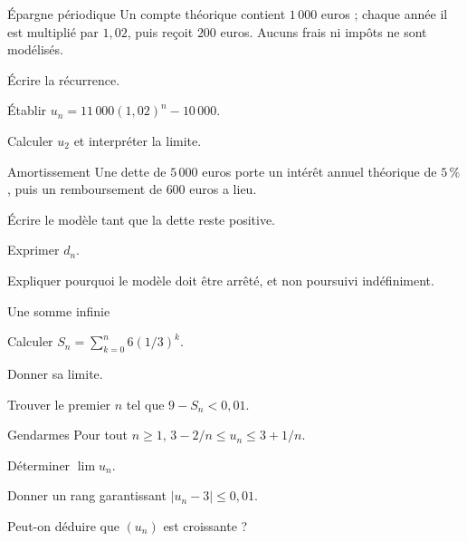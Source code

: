 \begingroup\renewcommand{\otBesoinPlace}[1]{}\begin{minipage}{\linewidth}
\begin{exercice}[2]{Épargne périodique}
Un compte théorique contient $1\,000$ euros ; chaque année il est multiplié par $1{,}02$, puis reçoit $200$ euros. Aucuns frais ni impôts ne sont modélisés.
\begin{questions}
\item Écrire la récurrence.
\item Établir $u_n=11\,000(1{,}02)^n-10\,000$.
\item Calculer $u_2$ et interpréter la limite.
\end{questions}
\end{exercice}
\begin{exercice}[2]{Amortissement}
Une dette de $5\,000$ euros porte un intérêt annuel théorique de $5\,\%$, puis un remboursement de $600$ euros a lieu.
\begin{questions}
\item Écrire le modèle tant que la dette reste positive.
\item Exprimer $d_n$.
\item Expliquer pourquoi le modèle doit être arrêté, et non poursuivi indéfiniment.
\end{questions}
\end{exercice}
\begin{exercice}[2]{Une somme infinie}

\begin{questions}
\item Calculer $S_n=\sum_{k=0}^{n}6(1/3)^k$.
\item Donner sa limite.
\item Trouver le premier $n$ tel que $9-S_n<0{,}01$.
\end{questions}
\end{exercice}
\begin{exercice}[2]{Gendarmes}
Pour tout $n\geq1$, $3-2/n\leq u_n\leq3+1/n$.
\begin{questions}
\item Déterminer $\lim u_n$.
\item Donner un rang garantissant $|u_n-3|\leq0{,}01$.
\item Peut-on déduire que $(u_n)$ est croissante ?
\end{questions}
\end{exercice}
\end{minipage}\endgroup
\clearpage
{}

